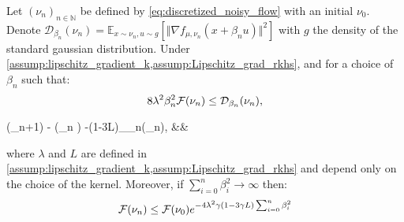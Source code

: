 \begin{proposition}\label{thm:convergence_noisy_gradient}
	Let $(\nu_n)_{n\in \mathbb{N}}$ be defined by \cref{eq:discretized_noisy_flow} with an initial $\nu_0$. Denote $\mathcal{D}_{\beta_n}(\nu_n)=\mathbb{E}_{x\sim \nu_n, u\sim g}[\Vert \nabla f_{\mu,\nu_n}(x+\beta_n u) \Vert^2]$ with $g$ the density of the standard gaussian distribution.	Under \cref{assump:lipschitz_gradient_k,assump:Lipschitz_grad_rkhs}, and for a choice of $\beta_n$ such that:
	\begin{equation}\label{eq:control_level_noise}
	8\lambda^2\beta_n^2 {{\mathcal F}}(\nu_n) \leq \mathcal{D}_{\beta_n}(\nu_n),
	\end{equation}
	\begin{flalign}\label{eq:decreasing_loss_iterations}
\quad\quad	\F(\nu_{n+1}) - \F(\nu_n  ) \leq -(1-3\gamma L)_{\beta_n}(\nu_n), &&
	\end{flalign}
	where $\lambda$ and $L$ are defined in \cref{assump:lipschitz_gradient_k,assump:Lipschitz_grad_rkhs} and depend only on the choice of the kernel. Moreover, if  $\sum_{i=0}^n \beta_i^2 \rightarrow \infty $ then:
	\begin{equation}
	{{\mathcal F}}(\nu_n)\leq {{\mathcal F}}(\nu_0) e^{-4\lambda^2\gamma(1-3\gamma L)\sum_{i=0}^n \beta^2_i}
	\end{equation}
\end{proposition}



